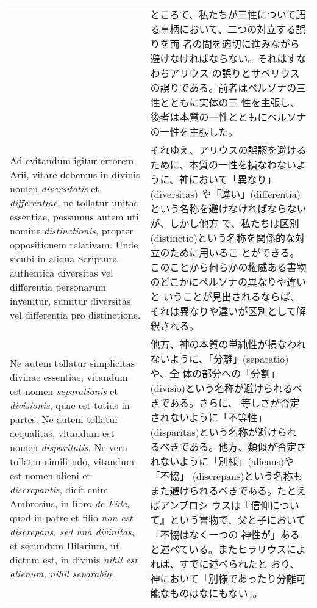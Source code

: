 \documentclass[10pt]{jsarticle} %
\begin{document}
\begin{longtable}{p{21em}p{21em}}
&

ところで、私たちが三性について語る事柄において、二つの対立する誤りを両
 者の間を適切に進みながら避けなければならない。それはすなわちアリウス
 の誤りとサベリウスの誤りである。前者はペルソナの三性とともに実体の三
 性を主張し、後者は本質の一性とともにペルソナの一性を主張した。

\\


Ad evitandum
igitur errorem Arii, vitare debemus in divinis nomen {\itshape diversitatis} et
{\itshape differentiae}, ne tollatur unitas essentiae, possumus autem uti nomine
{\itshape distinctionis}, propter oppositionem relativam. Unde sicubi in aliqua
Scriptura authentica diversitas vel differentia personarum invenitur,
sumitur diversitas vel differentia pro distinctione. 

&

それゆえ、アリウスの誤謬を避けるために、本質の一性を損なわないように、神において「異なり」(diversitas)
や「違い」(differentia)という名称を避けなければならないが、しかし他方
 で、私たちは区別(distinctio)という名称を関係的な対立のために用いるこ
 とができる。このことから何らかの権威ある書物のどこかにペルソナの異なりや違いと
 いうことが見出されるならば、それは異なりや違いが区別として解釈される。

\\


Ne autem tollatur
simplicitas divinae essentiae, vitandum est nomen {\itshape separationis} et
{\itshape divisionis}, quae est totius in partes. Ne autem tollatur aequalitas,
vitandum est nomen {\itshape disparitatis}. Ne vero tollatur similitudo, vitandum
est nomen alieni et {\itshape discrepantis}, dicit enim Ambrosius, in libro {\itshape de
Fide}, quod in patre et filio {\itshape non est discrepans, sed una divinitas}, et
secundum Hilarium, ut dictum est, in divinis {\itshape nihil est alienum, nihil
separabile}. 


&

他方、神の本質の単純性が損なわれないように、「分離」(separatio)や、全
 体の部分への「分割」(divisio)という名称が避けられるべきである。さらに、
 等しさが否定されないように「不等性」(disparitas)という名称が避けられ
 るべきである。他方、類似が否定されないように「別様」(alienus)や「不協」
 (discrepans)という名称もまた避けられるべきである。たとえばアンブロシ
 ウスは『信仰について』という書物で、父と子において「不協はなく一つの
 神性が」あると述べている。またヒラリウスによれば、すでに述べられたと
 おり、神において「別様であったり分離可能なものはなにもない」。


\end{longtable}
\end{document}
